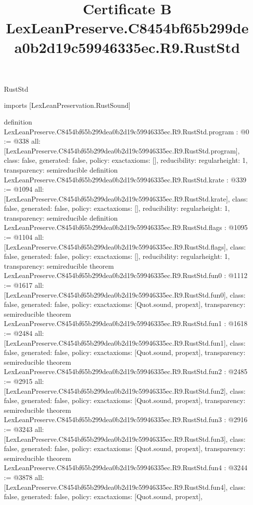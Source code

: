 \begin{lexlean}{RustStd}
\title{Certificate B LexLeanPreserve.C8454bf65b299dea0b2d19c59946335ec.R9.RustStd}
\begin{coremodule}
imports [LexLeanPreservation.RustSound]

definition LexLeanPreserve.C8454bf65b299dea0b2d19c59946335ec.R9.RustStd.program : @0 := @338 {
  all: [LexLeanPreserve.C8454bf65b299dea0b2d19c59946335ec.R9.RustStd.program],
  class: false,
  generated: false,
  policy: exact{axioms: []},
  reducibility: regular{height: 1},
  transparency: semireducible
}
definition LexLeanPreserve.C8454bf65b299dea0b2d19c59946335ec.R9.RustStd.krate : @339 := @1094 {
  all: [LexLeanPreserve.C8454bf65b299dea0b2d19c59946335ec.R9.RustStd.krate],
  class: false,
  generated: false,
  policy: exact{axioms: []},
  reducibility: regular{height: 1},
  transparency: semireducible
}
definition LexLeanPreserve.C8454bf65b299dea0b2d19c59946335ec.R9.RustStd.flags : @1095 := @1104 {
  all: [LexLeanPreserve.C8454bf65b299dea0b2d19c59946335ec.R9.RustStd.flags],
  class: false,
  generated: false,
  policy: exact{axioms: []},
  reducibility: regular{height: 1},
  transparency: semireducible
}
theorem LexLeanPreserve.C8454bf65b299dea0b2d19c59946335ec.R9.RustStd.fun0 : @1112 := @1617 {
  all: [LexLeanPreserve.C8454bf65b299dea0b2d19c59946335ec.R9.RustStd.fun0],
  class: false,
  generated: false,
  policy: exact{axioms: [Quot.sound, propext]},
  transparency: semireducible
}
theorem LexLeanPreserve.C8454bf65b299dea0b2d19c59946335ec.R9.RustStd.fun1 : @1618 := @2484 {
  all: [LexLeanPreserve.C8454bf65b299dea0b2d19c59946335ec.R9.RustStd.fun1],
  class: false,
  generated: false,
  policy: exact{axioms: [Quot.sound, propext]},
  transparency: semireducible
}
theorem LexLeanPreserve.C8454bf65b299dea0b2d19c59946335ec.R9.RustStd.fun2 : @2485 := @2915 {
  all: [LexLeanPreserve.C8454bf65b299dea0b2d19c59946335ec.R9.RustStd.fun2],
  class: false,
  generated: false,
  policy: exact{axioms: [Quot.sound, propext]},
  transparency: semireducible
}
theorem LexLeanPreserve.C8454bf65b299dea0b2d19c59946335ec.R9.RustStd.fun3 : @2916 := @3243 {
  all: [LexLeanPreserve.C8454bf65b299dea0b2d19c59946335ec.R9.RustStd.fun3],
  class: false,
  generated: false,
  policy: exact{axioms: [Quot.sound, propext]},
  transparency: semireducible
}
theorem LexLeanPreserve.C8454bf65b299dea0b2d19c59946335ec.R9.RustStd.fun4 : @3244 := @3878 {
  all: [LexLeanPreserve.C8454bf65b299dea0b2d19c59946335ec.R9.RustStd.fun4],
  class: false,
  generated: false,
  policy: exact{axioms: [Quot.sound, propext]},
}
\end{coremodule}
\end{lexlean}
